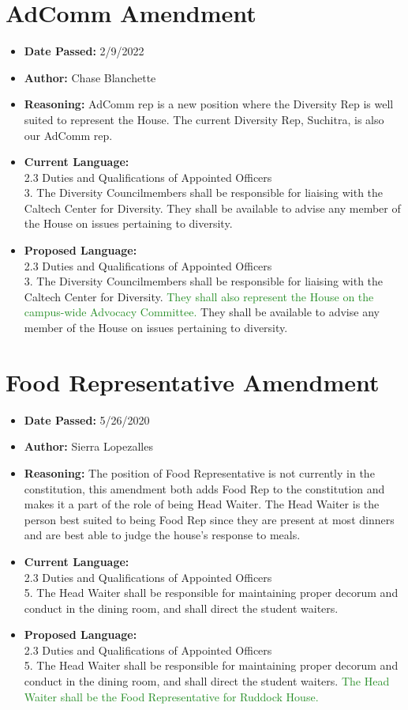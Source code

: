 \documentclass[10pt]{article} %
\begin{document}
\section{AdComm Amendment}
\begin{itemize}
	\item \textbf{Date Passed:} 2/9/2022
	\item \textbf{Author:} Chase Blanchette
	\item \textbf{Reasoning:} AdComm rep is a new position where the Diversity Rep is well suited to represent the House. The current Diversity Rep, Suchitra, is also our AdComm rep.
	\item \textbf{Current Language:} \\
	2.3 Duties and Qualifications of Appointed Officers \\
	3. The Diversity Councilmembers shall be responsible for liaising with the Caltech Center for Diversity. They shall be available to advise any member of the House on issues pertaining to diversity. 
	\item \textbf{Proposed Language:} \\
	2.3 Duties and Qualifications of Appointed Officers \\
	3. The Diversity Councilmembers shall be responsible for liaising with the Caltech Center for Diversity. \textcolor{ForestGreen}{They shall also represent the House on the campus-wide Advocacy Committee. }They shall be available to advise any member of the House on issues pertaining to diversity. 
\end{itemize}

\section{Food Representative Amendment}
\begin{itemize}
	\item \textbf{Date Passed:} 5/26/2020
	\item \textbf{Author:} Sierra Lopezalles
	\item \textbf{Reasoning:} The position of Food Representative is not currently in the constitution, this amendment both adds Food Rep to the constitution and makes it a part of the role of being Head Waiter. The Head Waiter is the person best suited to being Food Rep since they are present at most dinners and are best able to judge the house’s response to meals.
	\item \textbf{Current Language:} \\
	2.3 Duties and Qualifications of Appointed Officers \\
	5. The Head Waiter shall be responsible for maintaining proper decorum and conduct in the dining room, and shall direct the student waiters.
	\item \textbf{Proposed Language:} \\
	2.3 Duties and Qualifications of Appointed Officers \\
	5. The Head Waiter shall be responsible for maintaining proper decorum and conduct in the dining room, and shall direct the student waiters. \textcolor{ForestGreen}{The Head Waiter shall be the Food Representative for Ruddock House.}
\end{itemize}
\end{document}

